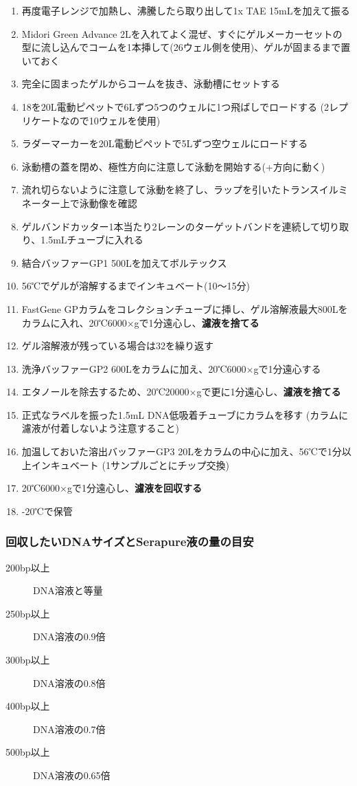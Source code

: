 \documentclass[titlepage,10pt,a4paper,uplatex]{jsbook}
\renewcommand{\textbf}[1]{{\bfseries\sffamily#1}}
\begin{document}
\begin{enumerate}
\item 再度電子レンジで加熱し、沸騰したら取り出して1x TAE 15mLを加えて振る
\item Midori Green Advance 2{\textmu}Lを入れてよく混ぜ、すぐにゲルメーカーセットの型に流し込んでコームを1本挿して(26ウェル側を使用)、ゲルが固まるまで置いておく
\item 完全に固まったゲルからコームを抜き、泳動槽にセットする
\item 18を20{\textmu}L電動ピペットで6{\textmu}Lずつ5つのウェルに1つ飛ばしでロードする (2レプリケートなので10ウェルを使用)
\item ラダーマーカーを20{\textmu}L電動ピペットで5{\textmu}Lずつ空ウェルにロードする
\item 泳動槽の蓋を閉め、極性方向に注意して泳動を開始する(+方向に動く)
\item 流れ切らないように注意して泳動を終了し、ラップを引いたトランスイルミネーター上で泳動像を確認
\item ゲルバンドカッター1本当たり2レーンのターゲットバンドを連続して切り取り、1.5mLチューブに入れる
\item 結合バッファーGP1 500{\textmu}Lを加えてボルテックス
\item 56℃でゲルが溶解するまでインキュベート(10～15分)
\item FastGene GPカラムをコレクションチューブに挿し、ゲル溶解液最大800{\textmu}Lをカラムに入れ、20℃6000×gで1分遠心し、\textbf{濾液を捨てる}
\item ゲル溶解液が残っている場合は32を繰り返す
\item 洗浄バッファーGP2 600{\textmu}Lをカラムに加え、20℃6000×gで1分遠心する
\item エタノールを除去するため、20℃20000×gで更に1分遠心し、\textbf{濾液を捨てる}
\item 正式なラベルを振った1.5mL DNA低吸着チューブにカラムを移す (カラムに濾液が付着しないよう注意すること)
\item 加温しておいた溶出バッファーGP3 20{\textmu}Lをカラムの中心に加え、56℃で1分以上インキュベート (1サンプルごとにチップ交換)
\item 20℃6000×gで1分遠心し、\textbf{濾液を回収する}
\item -20℃で保管
\end{enumerate}

\subsubsection{回収したいDNAサイズとSerapure液の量の目安}
\begin{description}
\item[200bp以上] DNA溶液と等量
\item[250bp以上] DNA溶液の0.9倍
\item[300bp以上] DNA溶液の0.8倍
\item[400bp以上] DNA溶液の0.7倍
\item[500bp以上] DNA溶液の0.65倍
\end{description}
\end{document}
